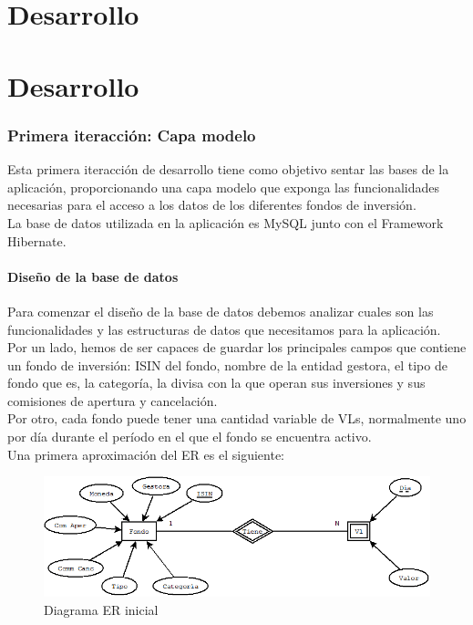 \documentclass[12pt, a4paper]{article}
\newcommand*\parttitle{}
\let\origpart\part
\renewcommand*{\part}[2][]{%
	\ifx\\#1\\%
	\origpart{#2}%
	\renewcommand*\parttitle{#2}%
	\else
	\origpart[#1]{#2}%
	\renewcommand*\parttitle{#1}%
	\fi
}
\begin{document}
\newpage

\part{Desarrollo}
\section{Primera iteracción: Capa modelo}

Esta primera iteracción de desarrollo tiene como objetivo sentar las bases de la aplicación, proporcionando una capa modelo que exponga las funcionalidades necesarias para el acceso a los datos de los diferentes fondos de inversión.\\

La base de datos utilizada en la aplicación es MySQL junto con el Framework Hibernate.

\subsection{Diseño de la base de datos}
Para comenzar el diseño de la base de datos debemos analizar cuales son las funcionalidades y las estructuras de datos que necesitamos para la aplicación.\\

Por un lado, hemos de ser capaces de guardar los principales campos que contiene un fondo de inversión: \gls{ISIN} del fondo, nombre de la entidad gestora, el tipo de fondo que es, la categoría, la divisa con la que operan sus inversiones y sus comisiones de apertura y cancelación.\\

Por otro, cada fondo puede tener una cantidad variable de \gls{VL}s, normalmente uno por día durante el período en el que el fondo se encuentra activo.\\

Una primera aproximación del \gls{ER} es el siguiente:\\



\begin{figure}[htbp]
	\centering
	\includegraphics[width=\textwidth]{figuras/ERSimple.png}
	\caption{Diagrama ER inicial}
	\label{fig:erinicial}
\end {figure}
\end{document}
